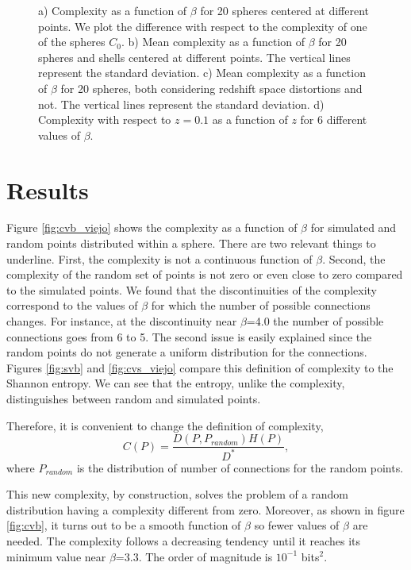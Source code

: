 \documentclass[fleqn,usenatbib]{mnras}
\begin{document}
\begin{figure}
    \caption{a) Complexity as a function of $\beta$ for 20 spheres
      centered at different points. We plot the difference with
      respect to the complexity of one of the spheres $C_0$. b) Mean
      complexity as a function of $\beta$ for 20 spheres and shells
      centered at different points. The vertical lines represent the
      standard deviation. c) Mean complexity as a function of $\beta$
      for 20 spheres, both considering redshift space distortions and
      not. The vertical lines represent the standard deviation. d)
      Complexity with respect to $z=0.1$ as a function of $z$ for 6
      different values of $\beta$.} 
    \label{fig:4graf}
\end{figure}


\section{Results}
\label{sec:results}

Figure \ref{fig:cvb_viejo} shows the complexity as a function of
$\beta$ for simulated and random points distributed within a
sphere. There are two relevant things to underline. First, the
complexity is not a continuous function of $\beta$. Second, the
complexity of the random set of points is not zero or even close to
zero compared to the simulated points. We found that the
discontinuities of the complexity correspond to the values of $\beta$
for which the number of possible connections changes. For instance, at
the discontinuity near $\beta$=4.0 the number of possible connections
goes from 6 to 5. The second issue is easily explained since the
random points do not generate a uniform distribution for the
connections. Figures \ref{fig:svb} and \ref{fig:cvs_viejo} compare
this definition of complexity to the Shannon entropy. We can see that
the entropy, unlike the complexity, distinguishes between random and
simulated points.  

Therefore, it is convenient to change the definition of complexity, 
\begin{equation}
    C(P)=\frac{D(P,P_{random})H(P)}{D^{*}},
    \label{eq:comp_def2}
\end{equation}
where $P_{random}$ is the distribution of number of connections for
the random points. 

This new complexity, by construction, solves the problem of a random
distribution having a complexity different from zero. Moreover, as
shown in figure \ref{fig:cvb}, it turns out to be a smooth function of
$\beta$ so fewer values of $\beta$ are needed. The complexity follows
a decreasing tendency until it reaches its minimum value near
$\beta$=3.3. The order of magnitude is $10^{-1}$ bits$^{2}$. 
\end{document}
